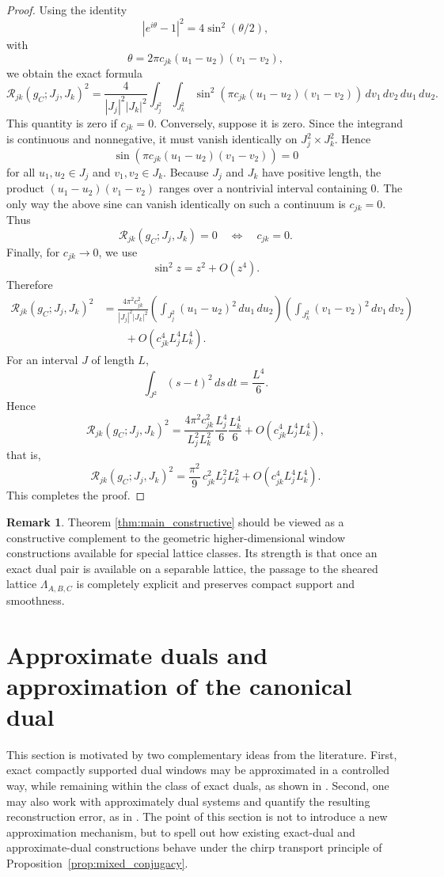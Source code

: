 \documentclass[final,1p,times,authoryear]{elsarticle}
\theoremstyle{definition}
\newtheorem{remark}[theorem]{Remark}
\newcommand{\1}{\mathbf{1}}
\begin{document}
\begin{proof}
{Using the identity
$$
|e^{i\theta}-1|^2=4\sin^2(\theta/2),
$$
with
$$
\theta=2\pi c_{jk}(u_1-u_2)(v_1-v_2),
$$
we obtain the exact formula
$$
\mathcal R_{jk}(g_C;J_j,J_k)^2
=
\frac{4}{|J_j|^2|J_k|^2}
\int_{J_j^2}\int_{J_k^2}
\sin^2\!\left(
\pi c_{jk}(u_1-u_2)(v_1-v_2)
\right)
\,dv_1\,dv_2\,du_1\,du_2.
$$
This quantity is zero if $c_{jk}=0$. Conversely, suppose it is zero. Since the integrand is
continuous and nonnegative, it must vanish identically on
$J_j^2\times J_k^2$. Hence
$$
\sin\!\left(
\pi c_{jk}(u_1-u_2)(v_1-v_2)
\right)=0
$$
for all $u_1,u_2\in J_j$ and $v_1,v_2\in J_k$. Because $J_j$ and $J_k$
have positive length, the product
$(u_1-u_2)(v_1-v_2)$ ranges over a nontrivial interval containing $0$.
The only way the above sine can vanish identically on such a continuum is $c_{jk}=0$.
Thus
$$
\mathcal R_{jk}(g_C;J_j,J_k)=0
\quad\Longleftrightarrow\quad
c_{jk}=0.
$$
Finally, for $c_{jk}\to0$, we use
$$
\sin^2 z=z^2+O(z^4).
$$
Therefore
$$
\begin{aligned}
\mathcal R_{jk}(g_C;J_j,J_k)^2
&=
\frac{4\pi^2c_{jk}^2}{|J_j|^2|J_k|^2}
\left(
\int_{J_j^2}(u_1-u_2)^2\,du_1\,du_2
\right)
\left(
\int_{J_k^2}(v_1-v_2)^2\,dv_1\,dv_2
\right)\\
&\qquad
+
O\!\left(c_{jk}^4 L_j^4L_k^4\right).
\end{aligned}
$$
For an interval $J$ of length $L$,
$$
\int_{J^2}(s-t)^2\,ds\,dt=\frac{L^4}{6}.
$$
Hence
$$
\mathcal R_{jk}(g_C;J_j,J_k)^2
=
\frac{4\pi^2c_{jk}^2}{L_j^2L_k^2}
\frac{L_j^4}{6}\frac{L_k^4}{6}
+
O\!\left(c_{jk}^4 L_j^4L_k^4\right),
$$
that is,
$$
\mathcal R_{jk}(g_C;J_j,J_k)^2
=
\frac{\pi^2}{9}\,c_{jk}^2L_j^2L_k^2
+
O\!\left(c_{jk}^4L_j^4L_k^4\right).
$$
This completes the proof.}
\end{proof}
\begin{remark}
Theorem \ref{thm:main_constructive} should be viewed as a constructive complement to the
geometric higher-dimensional window constructions available for special lattice classes.
Its strength is that once an exact dual pair is available on a separable lattice, the passage to the
sheared lattice $\Lambda_{A,B,C}$ is completely explicit and preserves compact support and smoothness.
\end{remark}

\section{Approximate duals and approximation of the canonical dual}
This section is motivated by two complementary ideas from the literature. First, exact compactly supported dual windows may be approximated in a controlled way, while remaining within the class of exact duals, as shown in \citep{Sto22}. Second, one may also work with approximately dual systems and quantify the resulting reconstruction error, as in \citep{CJKK18}. {The point of this section is not to introduce a new approximation mechanism, but to spell out
how existing exact-dual and approximate-dual constructions behave under the chirp transport
principle of Proposition~\ref{prop:mixed_conjugacy}.}
\end{document}

